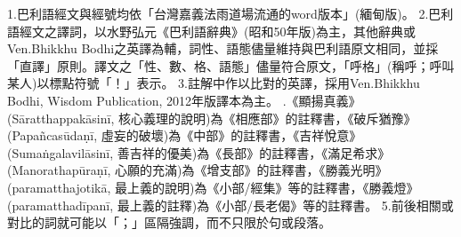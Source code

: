 \startReadNote
1.巴利語經文與經號均依「台灣嘉義法雨道場流通的word版本」(緬甸版)。
\blank
2.巴利語經文之譯詞，以水野弘元《巴利語辭典》(昭和50年版)為主，其他辭典或Ven.Bhikkhu Bodhi之英譯為輔，詞性、語態儘量維持與巴利語原文相同，並採「直譯」原則。譯文之「性、數、格、語態」儘量符合原文，「呼格」(稱呼；呼叫某人)以標點符號「！」表示。
\blank
3.註解中作以比對的英譯，採用Ven.Bhikkhu Bodhi, Wisdom Publication, 2012年版譯本為主。
.《顯揚真義》(Sāratthappakāsinī, 核心義理的說明)為《相應部》的註釋書，《破斥猶豫》(Papañcasūdaṇī, 虛妄的破壞)為《中部》的註釋書，《吉祥悅意》(Sumaṅgalavilāsinī, 善吉祥的優美)為《長部》的註釋書，《滿足希求》(Manorathapūraṇī, 心願的充滿)為《增支部》的註釋書，《勝義光明》(paramatthajotikā, 最上義的說明)為《小部/經集》等的註釋書，《勝義燈》(paramatthadīpanī, 最上義的註釋)為《小部/長老偈》等的註釋書。
\blank
5.前後相關或對比的詞就可能以「；」區隔強調，而不只限於句或段落。
\stopReadNote
